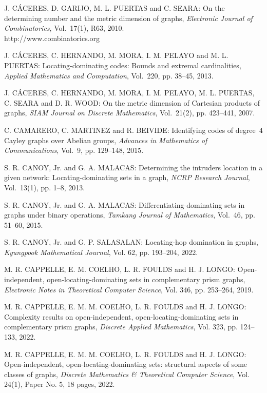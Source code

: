 \begin{thebibliography}{999}
J. C\'ACERES, D. GARIJO, M. L. PUERTAS and C. SEARA: On the determining number and the metric dimension of graphs, {\it Electronic Journal of Combinatorics}, Vol.~17(1), R63, 2010.\\
http://www.combinatorics.org

J. C\'ACERES, C. HERNANDO, M. MORA, I. M. PELAYO and M. L. PUERTAS: Locating-dominating codes: Bounds and extremal cardinalities, {\it Applied Mathematics and Computation}, Vol.~220, pp. 38--45, 2013.

J. C\'ACERES, C. HERNANDO, M. MORA, I. M. PELAYO, M. L. PUERTAS, C. SEARA and D. R. WOOD: On the metric dimension of Cartesian products of graphs, {\it SIAM Journal on Discrete Mathematics}, Vol.~21(2), pp. 423--441, 2007.

C. CAMARERO, C. MARTINEZ and R. BEIVIDE: Identifying codes of degree~$4$ Cayley graphs over Abelian groups, {\it Advances in Mathematics of Communications}, Vol.~9, pp. 129--148, 2015.

S. R. CANOY, Jr. and G. A. MALACAS: Determining the intruders location in a given network: Locating-dominating sets in a graph, {\it NCRP Research Journal}, Vol.~13(1), pp. 1--8, 2013.

S. R. CANOY, Jr. and G. A. MALACAS: Differentiating-dominating sets in graphs under binary operations, {\it Tamkang Journal of Mathematics}, Vol.~46, pp. 51--60, 2015.

S. R. CANOY, Jr. and G. P. SALASALAN: Locating-hop domination in graphs, {\it Kyungpook Mathematical Journal}, Vol. 62, pp. 193--204, 2022.

M. R. CAPPELLE, E. M. COELHO, L. R. FOULDS and H. J. LONGO: Open-independent, open-locating-dominating sets in complementary prism graphs, {\it Electronic Notes in Theoretical Computer Science}, Vol. 346, pp. 253--264, 2019.

M. R. CAPPELLE, E. M. M. COELHO, L. R. FOULDS and H. J. LONGO: Complexity results on open-independent, open-locating-dominating sets in complementary prism graphs, {\it Discrete Applied Mathematics}, Vol. 323, pp. 124--133, 2022.

M. R. CAPPELLE, E. M. M. COELHO, L. R. FOULDS and H. J. LONGO: Open-independent, open-locating-dominating sets: structural aspects of some classes of graphs, {\it Discrete Mathematics \& Theoretical Computer Science}, Vol. 24(1), Paper No. 5, 18 pages, 2022.


\end{thebibliography}

